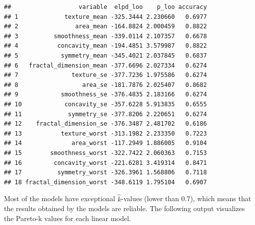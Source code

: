 \documentclass[
]{article}
\newenvironment{Shaded}{\begin{snugshade}}{\end{snugshade}}
\newcommand{\ControlFlowTok}[1]{\textcolor[rgb]{0.13,0.29,0.53}{\textbf{#1}}}
\newcommand{\DataTypeTok}[1]{\textcolor[rgb]{0.13,0.29,0.53}{#1}}
\newcommand{\DecValTok}[1]{\textcolor[rgb]{0.00,0.00,0.81}{#1}}
\newcommand{\FloatTok}[1]{\textcolor[rgb]{0.00,0.00,0.81}{#1}}
\newcommand{\KeywordTok}[1]{\textcolor[rgb]{0.13,0.29,0.53}{\textbf{#1}}}
\newcommand{\NormalTok}[1]{#1}
\newcommand{\OperatorTok}[1]{\textcolor[rgb]{0.81,0.36,0.00}{\textbf{#1}}}
\newcommand{\StringTok}[1]{\textcolor[rgb]{0.31,0.60,0.02}{#1}}
\begin{document}
\begin{verbatim}
##                   variable  elpd_loo    p_loo accuracy
## 1             texture_mean -325.3444 2.230660   0.6977
## 2                area_mean -164.8824 2.000459   0.8822
## 3          smoothness_mean -339.0114 2.107357   0.6678
## 4           concavity_mean -194.4851 3.579987   0.8822
## 5            symmetry_mean -345.4021 2.037845   0.6837
## 6   fractal_dimension_mean -377.6696 2.027334   0.6274
## 7               texture_se -377.7236 1.975586   0.6274
## 8                  area_se -181.7876 2.025407   0.8682
## 9            smoothness_se -376.4835 2.183166   0.6274
## 10            concavity_se -357.6228 5.913835   0.6555
## 11             symmetry_se -377.8206 2.220651   0.6274
## 12    fractal_dimension_se -376.3487 2.481702   0.6186
## 13           texture_worst -313.1982 2.233350   0.7223
## 14              area_worst -117.2949 1.886005   0.9104
## 15        smoothness_worst -322.7422 2.060363   0.7153
## 16         concavity_worst -221.6281 3.419314   0.8471
## 17          symmetry_worst -326.3961 1.568806   0.7118
## 18 fractal_dimension_worst -348.6119 1.795104   0.6907
\end{verbatim}

Most of the models have exceptional \(\hat{k}\)-values (lower than 0.7),
which means that the results obtained by the models are reliable. The
following output visualizes the Pareto-k values for each linear model.

\begin{Shaded}
\end{Shaded}
\end{document}
